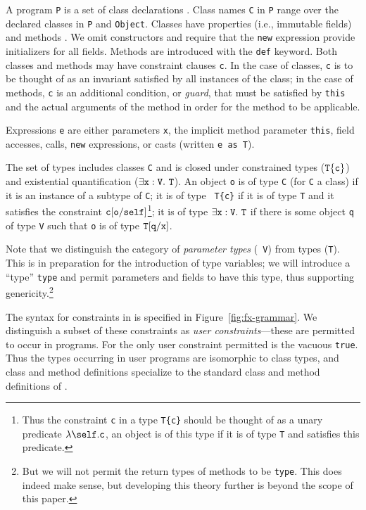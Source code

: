 A program {\tt P} is a set of class declarations .
Class names {\tt C} in {\tt P} range over the declared classes in {\tt P} 
and {\tt Object}.
Classes have
properties (i.e., immutable fields)  and methods .  We omit constructors
and require that the {\tt new} expression provide initializers
for all fields. 
Methods are introduced with the {\tt def} keyword.
Both classes and methods may have constraint clauses
{\tt c}.  In the case of classes, {\tt c} is to be thought of as an
invariant satisfied by all instances of the class; in the case of
methods, {\tt c} is an additional condition, or {\em guard},
that must be satisfied by
{\tt this} and the actual arguments of the method in order for the method to
be applicable. 

Expressions {\tt e} are either parameters {\tt x}, the implicit
method parameter {\tt this}, field accesses, calls, {\tt new}
expressions, or casts (written {\tt e as T}).

The set of types includes classes {\tt C} and is closed under
constrained types (${\tt T\{c\}}$) and existential
quantification ($\exists {\tt x}:{\tt V}.~{\tt T}$).
%
An object {\tt o} is of type {\tt C} (for {\tt C} a class)
if it is an instance of a subtype of {\tt C}; it is of type {\tt
T\{c\}} if it is of type {\tt T} and it satisfies the constraint $\tt
c[o/self]$\footnote{Thus the constraint {\tt c} in a type {\tt T\{c\}}
should be thought of as a unary predicate $\lambda\self.{\tt c}$, an
object is of this type if it is of type {\tt T} and satisfies this
predicate.}; it is of type
                $\exists {\tt x}:{\tt V}.~{\tt T}$
if there is some object {\tt q}
of type {\tt V} such that {\tt o} is of type
${\tt T}[{\tt q}/{\tt x}]$.

%
Note that we distinguish the category of {\em parameter types} ({\tt
V}) from types ({\tt T}). This is in preparation for the introduction
of type variables; we will introduce a ``type'' {\tt type} and permit
parameters and fields to have this type, thus supporting
genericity.\footnote{But we will not permit the return types of
methods to be {\tt type}. This does indeed make sense, but developing
this theory further is beyond the scope of this paper.}

The syntax for constraints in \FXZ{} is specified in
Figure~\ref{fig:fx-grammar}. We distinguish a subset of these constraints as
{\em user constraints}---these are permitted to occur in
programs. For \FXZ{} the only user constraint permitted is the vacuous
{\tt true}. Thus the types occurring in user programs are isomorphic
to class types, and class and method definitions specialize to the
standard class and method definitions of \FJ{}. 

